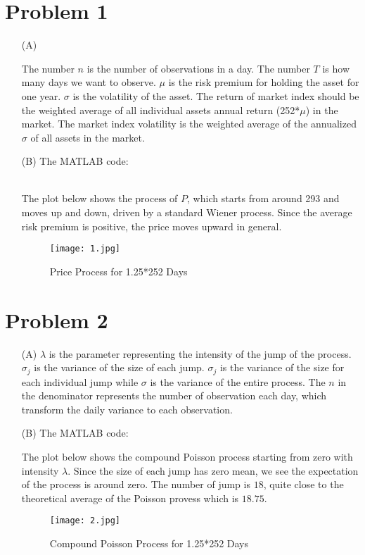 \documentclass[11pt]{amsart}
\theoremstyle{definition}
\begin{document}
\section*{Problem 1}
\begin{enumerate}
    \item [(A)]

The number $n$ is the number of observations in a day. The number $T$ is how many days we want to observe. $\mu$ is the risk premium for holding the asset for one year. $\sigma$ is the volatility of the asset. The return of market index should be the weighted average of all individual assets annual return (252*$\mu$) in the market. The market index volatility is the weighted average of the annualized $\sigma$ of all assets in the market.
    \item[(B)] The MATLAB code:
     
~\\
The plot below shows the process of $P$, which starts from around 293 and moves up and down, driven by a standard Wiener process. Since the average risk premium is positive, the price moves upward in general. 
\begin{figure}[htbp]
\centering
\texttt{[image: 1.jpg]}
\caption{Price Process for 1.25*252 Days}
\end{figure}

\end{enumerate}
\clearpage

\section*{Problem 2}
\begin{enumerate}
    \item [(A)] $\lambda$ is the parameter representing the  intensity of the jump of the process. $\sigma_{j}$ is the variance of the size of each jump. $\sigma_{j}$ is the variance of the size for each individual jump while $\sigma$ is the variance of the entire process. The $n$ in the denominator represents the number of observation each day, which transform the daily variance to each observation.
    
    \item [(B)] The MATLAB code:
  
The plot below shows the compound Poisson process starting from zero with intensity $\lambda$. Since the size of each jump has zero mean, we see the expectation of the process is around zero. The number of jump is $18$, quite close to the theoretical average of the Poisson provess which is $18.75$.
\begin{figure}[htbp]
\centering
\texttt{[image: 2.jpg]}
\caption{Compound Poisson Process for 1.25*252 Days}
\end{figure}

\end{enumerate}
\end{document}
